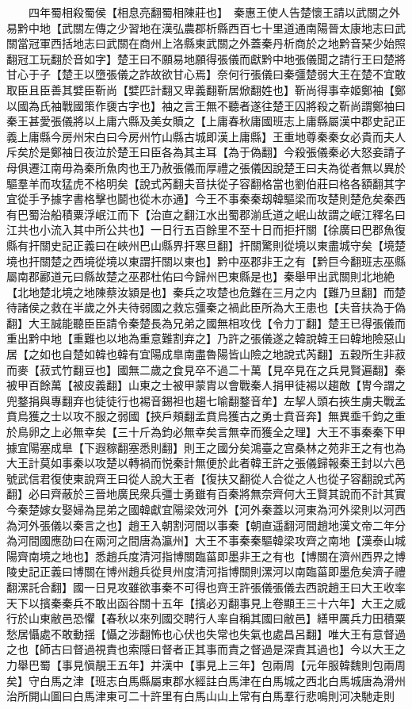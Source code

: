 　　四年蜀相殺蜀侯【相息亮翻蜀相陳莊也】　秦惠王使人告楚懷王請以武關之外易黔中地【武關左傳之少習地在漢弘農郡析縣西百七十里道通南陽晉太康地志曰武關當冠軍西括地志曰武關在商州上洛縣東武關之外蓋秦丹析商於之地黔音琹少始照翻冠工玩翻於音如字】楚王曰不願易地願得張儀而獻黔中地張儀聞之請行王曰楚將甘心于子【楚王以墮張儀之詐故欲甘心焉】奈何行張儀曰秦彊楚弱大王在楚不宜敢取臣且臣善其嬖臣靳尚【嬖匹計翻又卑義翻靳居焮翻姓也】靳尚得事幸姬鄭袖【鄭以國為氏袖戰國策作褏古字也】袖之言王無不聽者遂往楚王囚將殺之靳尚謂鄭袖曰秦王甚愛張儀將以上庸六縣及美女贖之【上庸春秋庸國班志上庸縣屬漢中郡史記正義上庸縣今房州宋白曰今房州竹山縣古城即漢上庸縣】王重地尊秦秦女必貴而夫人斥矣於是鄭袖日夜泣於楚王曰臣各為其主耳【為于偽翻】今殺張儀秦必大怒妾請子母俱遷江南毋為秦所魚肉也王乃赦張儀而厚禮之張儀因說楚王曰夫為從者無以異於驅羣羊而攻猛虎不格明矣【說式芮翻夫音扶從子容翻格當也劉伯莊曰格各額翻其字宜從手予據字書格擊也鬬也從木亦通】今王不事秦秦刼韓驅梁而攻楚則楚危矣秦西有巴蜀治船積粟浮岷江而下【治直之翻江水出蜀郡湔氐道之岷山故謂之岷江釋名曰江共也小流入其中所公共也】一日行五百餘里不至十日而拒扞關【徐廣曰巴郡魚復縣有扞關史記正義曰在峽州巴山縣界扞寒旦翻】扞關驚則從境以東盡城守矣【境楚境也扞關楚之西境從境以東謂扞關以東也】黔中巫郡非王之有【黔巨今翻班志巫縣屬南郡酈道元曰縣故楚之巫郡杜佑曰今歸州巴東縣是也】秦舉甲出武關則北地絶【北地楚北境之地陳蔡汝潁是也】秦兵之攻楚也危難在三月之内【難乃旦翻】而楚待諸侯之救在半歲之外夫待弱國之救忘彊秦之禍此臣所為大王患也【夫音扶為于偽翻】大王誠能聽臣臣請令秦楚長為兄弟之國無相攻伐【令力丁翻】楚王已得張儀而重出黔中地【重難也以地為重意難割弃之】乃許之張儀遂之韓說韓王曰韓地險惡山居【之如也自楚如韓也韓有宜陽成臯南盡魯陽皆山險之地說式芮翻】五穀所生非菽而麥【菽式竹翻豆也】國無二歲之食見卒不過二十萬【見卒見在之兵見賢遍翻】秦被甲百餘萬【被皮義翻】山東之士被甲蒙胄以會戰秦人捐甲徒裼以趨敵【冑今謂之兜鍪捐與專翻弃也徒徒行也裼音錫袒也趨七喻翻鍪音牟】左挈人頭右挾生虜夫戰孟賁烏獲之士以攻不服之弱國【挾戶頰翻孟賁烏獲古之勇士賁音奔】無異埀千鈞之重於鳥卵之上必無幸矣【三十斤為鈞必無幸矣言無幸而獲全之理】大王不事秦秦下甲據宜陽塞成臯【下遐稼翻塞悉則翻】則王之國分矣鴻臺之宫桑林之苑非王之有也為大王計莫如事秦以攻楚以轉禍而悦秦計無便於此者韓王許之張儀歸報秦王封以六邑號武信君復使東說齊王曰從人說大王者【復扶又翻從人合從之人也從子容翻說式芮翻】必曰齊蔽於三晉地廣民衆兵彊士勇雖有百秦將無奈齊何大王賢其說而不計其實今秦楚嫁女娶婦為昆弟之國韓獻宜陽梁效河外【河外秦蓋以河東為河外梁則以河西為河外張儀以秦言之也】趙王入朝割河間以事秦【朝直遥翻河間趙地漢文帝二年分為河間國應劭曰在兩河之間唐為瀛州】大王不事秦秦驅韓梁攻齊之南地【漢泰山城陽齊南境之地也】悉趙兵度清河指博關臨菑即墨非王之有也【博關在濟州西界之博陵史記正義曰博關在博州趙兵從貝州度清河指博關則漯河以南臨菑即墨危矣濟子禮翻漯託合翻】國一日見攻雖欲事秦不可得也齊王許張儀張儀去西說趙王曰大王收率天下以擯秦秦兵不敢出函谷關十五年【擯必刃翻事見上卷顯王三十六年】大王之威行於山東敝邑恐懼【春秋以來列國交聘行人率自稱其國曰敝邑】繕甲厲兵力田積粟愁居懾處不敢動揺【懾之涉翻怖也心伏也失常也失氣也處昌呂翻】唯大王有意督過之也【師古曰督過視責也索隱曰督者正其事而責之督過是深責其過也】今以大王之力舉巴蜀【事見愼靚王五年】并漢中【事見上三年】包兩周【元年服韓魏則包兩周矣】守白馬之津【班志白馬縣屬東郡水經註白馬津在白馬城之西北白馬城唐為滑州治所開山圖曰白馬津東可二十許里有白馬山山上常有白馬羣行悲鳴則河决馳走則
